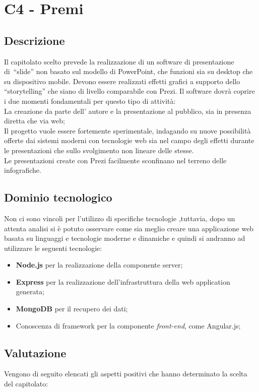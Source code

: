 \section{C4 - Premi}{
 \subsection{Descrizione}
   Il capitolato scelto prevede la realizzazione di un software di presentazione di\ “slide” non basato sul modello di PowerPoint, che funzioni sia su desktop che su dispositivo mobile. Devono essere realizzati effetti grafici a supporto dello  “storytelling” che siano di livello comparabile con Prezi.
   Il software dovrà coprire i due momenti fondamentali per questo tipo di attività:\\
   La creazione da parte dell' autore e la presentazione al pubblico, sia in presenza diretta che via web;\\
   Il progetto vuole essere fortemente sperimentale, indagando su nuove possibilità  offerte dai sistemi moderni con tecnologie web sia nel campo degli effetti durante le presentazioni che sullo svolgimento non lineare delle stesse.\\
   Le presentazioni create con Prezi facilmente sconfinano nel terreno delle infografiche.

\subsection{Dominio tecnologico}
Non ci sono vincoli per l'utilizzo di specifiche tecnologie ,tuttavia, dopo un attenta analisi si è potuto osservare come sia meglio creare una applicazione web basata su linguaggi e tecnologie moderne e dinamiche e quindi si andranno ad utilizzare le seguenti tecnologie:
\begin{itemize}
\item \textbf{Node.js}  per la realizzazione della componente server;
\item \textbf{Express}  per la realizzazione dell'infrastruttura della web application generata;
\item \textbf{MongoDB}  per il recupero dei dati;
\item Conoscenza di framework per la componente \emph{front-end}, come Angular.js;

\end{itemize}
\subsection{Valutazione}
Vengono di seguito elencati gli aspetti positivi che hanno determinato la scelta del capitolato:

}
